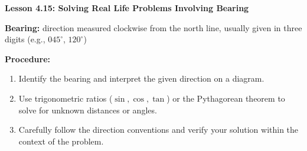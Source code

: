 \begin{center}
\textbf{Lesson 4.15: Solving Real Life Problems Involving Bearing}
\end{center}

\vspace*{-1.5ex}

\noindent \textbf{Bearing:} direction measured clockwise from the north line, usually given in three digits (e.g., \(045^\circ\), \(120^\circ\))

\noindent  \textbf{Procedure:}
    \begin{enumerate}
        \item Identify the bearing and interpret the given direction on a diagram.
        \item Use trigonometric ratios (\(\sin, \cos, \tan\)) or the Pythagorean theorem to solve for unknown distances or angles.
        \item Carefully follow the direction conventions and verify your solution within the context of the problem.
    \end{enumerate}
